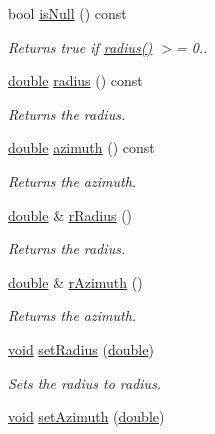 \begin{DoxyCompactItemize}
bool \hyperlink{class_qwt_point_polar_a73d21f582ee5960011300598e17fab00}{is\-Null} () const 
\begin{DoxyCompactList}\small\item\em Returns true if \hyperlink{class_qwt_point_polar_ab629fcfb36f0f29df45b256c6bddf194}{radius()} $>$= 0.. \end{DoxyCompactList}\item 
\hyperlink{_super_l_u_support_8h_a8956b2b9f49bf918deed98379d159ca7}{double} \hyperlink{class_qwt_point_polar_ab629fcfb36f0f29df45b256c6bddf194}{radius} () const 
\begin{DoxyCompactList}\small\item\em Returns the radius. \end{DoxyCompactList}\item 
\hyperlink{_super_l_u_support_8h_a8956b2b9f49bf918deed98379d159ca7}{double} \hyperlink{class_qwt_point_polar_afac65de2dca25b0b6a6c5fb917fff424}{azimuth} () const 
\begin{DoxyCompactList}\small\item\em Returns the azimuth. \end{DoxyCompactList}\item 
\hyperlink{_super_l_u_support_8h_a8956b2b9f49bf918deed98379d159ca7}{double} \& \hyperlink{class_qwt_point_polar_a69cf76a959e4417038b4e2684d307847}{r\-Radius} ()
\begin{DoxyCompactList}\small\item\em Returns the radius. \end{DoxyCompactList}\item 
\hyperlink{_super_l_u_support_8h_a8956b2b9f49bf918deed98379d159ca7}{double} \& \hyperlink{class_qwt_point_polar_ae509330927d54dbc7cf65fae42083fce}{r\-Azimuth} ()
\begin{DoxyCompactList}\small\item\em Returns the azimuth. \end{DoxyCompactList}\item 
\hyperlink{group___u_a_v_objects_plugin_ga444cf2ff3f0ecbe028adce838d373f5c}{void} \hyperlink{class_qwt_point_polar_a31ae2f4d6fad44f51ad5e7444a7f21fe}{set\-Radius} (\hyperlink{_super_l_u_support_8h_a8956b2b9f49bf918deed98379d159ca7}{double})
\begin{DoxyCompactList}\small\item\em Sets the radius to radius. \end{DoxyCompactList}\item 
\hyperlink{group___u_a_v_objects_plugin_ga444cf2ff3f0ecbe028adce838d373f5c}{void} \hyperlink{class_qwt_point_polar_a32c6c64510fce3e087d332305b4aca9e}{set\-Azimuth} (\hyperlink{_super_l_u_support_8h_a8956b2b9f49bf918deed98379d159ca7}{double})

\end{DoxyCompactItemize}
